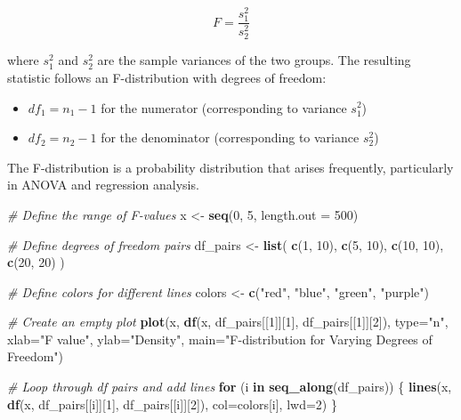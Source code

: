 \documentclass[
  letterpaper,
]{book}
\newenvironment{Shaded}{\begin{snugshade}}{\end{snugshade}}
\newcommand{\AttributeTok}[1]{\textcolor[rgb]{0.13,0.29,0.53}{#1}}
\newcommand{\CommentTok}[1]{\textcolor[rgb]{0.56,0.35,0.01}{\textit{#1}}}
\newcommand{\ControlFlowTok}[1]{\textcolor[rgb]{0.13,0.29,0.53}{\textbf{#1}}}
\newcommand{\DecValTok}[1]{\textcolor[rgb]{0.00,0.00,0.81}{#1}}
\newcommand{\FunctionTok}[1]{\textcolor[rgb]{0.13,0.29,0.53}{\textbf{#1}}}
\newcommand{\NormalTok}[1]{#1}
\newcommand{\OtherTok}[1]{\textcolor[rgb]{0.56,0.35,0.01}{#1}}
\newcommand{\StringTok}[1]{\textcolor[rgb]{0.31,0.60,0.02}{#1}}
\providecommand{\tightlist}{%
  \setlength{\itemsep}{0pt}\setlength{\parskip}{0pt}}\usepackage{longtable,booktabs,array}
\begin{document}
\[
F = \frac{s_1^2}{s_2^2}
\]

where \(s_1^2\) and \(s_2^2\) are the sample variances of the two
groups. The resulting statistic follows an F-distribution with degrees
of freedom:

\begin{itemize}
\tightlist
\item
  \(df_1 = n_1 - 1\) for the numerator (corresponding to variance
  \(s_1^2\))
\item
  \(df_2 = n_2 - 1\) for the denominator (corresponding to variance
  \(s_2^2\))
\end{itemize}

The F-distribution is a probability distribution that arises frequently,
particularly in ANOVA and regression analysis.

\begin{Shaded}
\begin{Highlighting}[]
\CommentTok{\# Define the range of F{-}values}
\NormalTok{x }\OtherTok{\textless{}{-}} \FunctionTok{seq}\NormalTok{(}\DecValTok{0}\NormalTok{, }\DecValTok{5}\NormalTok{, }\AttributeTok{length.out =} \DecValTok{500}\NormalTok{)}

\CommentTok{\# Define degrees of freedom pairs}
\NormalTok{df\_pairs }\OtherTok{\textless{}{-}} \FunctionTok{list}\NormalTok{(}
  \FunctionTok{c}\NormalTok{(}\DecValTok{1}\NormalTok{, }\DecValTok{10}\NormalTok{),}
  \FunctionTok{c}\NormalTok{(}\DecValTok{5}\NormalTok{, }\DecValTok{10}\NormalTok{),}
  \FunctionTok{c}\NormalTok{(}\DecValTok{10}\NormalTok{, }\DecValTok{10}\NormalTok{),}
  \FunctionTok{c}\NormalTok{(}\DecValTok{20}\NormalTok{, }\DecValTok{20}\NormalTok{)}
\NormalTok{)}

\CommentTok{\# Define colors for different lines}
\NormalTok{colors }\OtherTok{\textless{}{-}} \FunctionTok{c}\NormalTok{(}\StringTok{"red"}\NormalTok{, }\StringTok{"blue"}\NormalTok{, }\StringTok{"green"}\NormalTok{, }\StringTok{"purple"}\NormalTok{)}

\CommentTok{\# Create an empty plot}
\FunctionTok{plot}\NormalTok{(x, }\FunctionTok{df}\NormalTok{(x, df\_pairs[[}\DecValTok{1}\NormalTok{]][}\DecValTok{1}\NormalTok{], df\_pairs[[}\DecValTok{1}\NormalTok{]][}\DecValTok{2}\NormalTok{]), }\AttributeTok{type=}\StringTok{"n"}\NormalTok{,}
     \AttributeTok{xlab=}\StringTok{"F value"}\NormalTok{, }\AttributeTok{ylab=}\StringTok{"Density"}\NormalTok{,}
     \AttributeTok{main=}\StringTok{"F{-}distribution for Varying Degrees of Freedom"}\NormalTok{)}

\CommentTok{\# Loop through df pairs and add lines}
\ControlFlowTok{for}\NormalTok{ (i }\ControlFlowTok{in} \FunctionTok{seq\_along}\NormalTok{(df\_pairs)) \{}
  \FunctionTok{lines}\NormalTok{(x, }\FunctionTok{df}\NormalTok{(x, df\_pairs[[i]][}\DecValTok{1}\NormalTok{], df\_pairs[[i]][}\DecValTok{2}\NormalTok{]), }\AttributeTok{col=}\NormalTok{colors[i], }\AttributeTok{lwd=}\DecValTok{2}\NormalTok{)}
\NormalTok{\}}


\end{Highlighting}
\end{Shaded}
\end{document}
